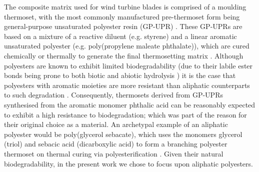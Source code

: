 The composite matrix used for wind turbine blades is comprised of a moulding 
 thermoset, with the most commonly manufactured pre-thermoset form being 
 general-purpose unsaturated polyester resin (GP-UPR) \autocite{Bobade2016}.
These GP-UPRs are based on a mixture of a reactive diluent (e.g. styrene) and 
 a linear aromatic unsaturated polyester (e.g. poly(propylene maleate
 phthalate)), which are cured chemically or thermally to generate the final
 thermosetting matrix \autocite{Ahamad2001}.
Although polyesters are known to exhibit limited biodegradability (due to 
 their labile ester bonds being prone to both biotic and abiotic hydrolysis
 \autocite{Sharma2011}) it is the case that polyesters with aromatic moieties
 are more resistant than aliphatic counterparts to such degradation
 \autocite{Muller2001}.
Consequently, thermosets derived from GP-UPRs synthesised from the aromatic 
 monomer phthalic acid \autocite{Ahamad2001} can be reasonably expected to
 exhibit a high resistance to biodegradation; which was part of the reason
 for their original choice as a material.
An archetypal example of an aliphatic polyester would be poly(glycerol
 sebacate), which uses the monomers glycerol (triol) and sebacic acid
 (dicarboxylic acid) to form a branching polyester thermoset on thermal
 curing via polyesterification \autocite{Zhang2014}.
Given their natural biodegradability, in the present work we chose to focus 
 upon aliphatic polyesters.

